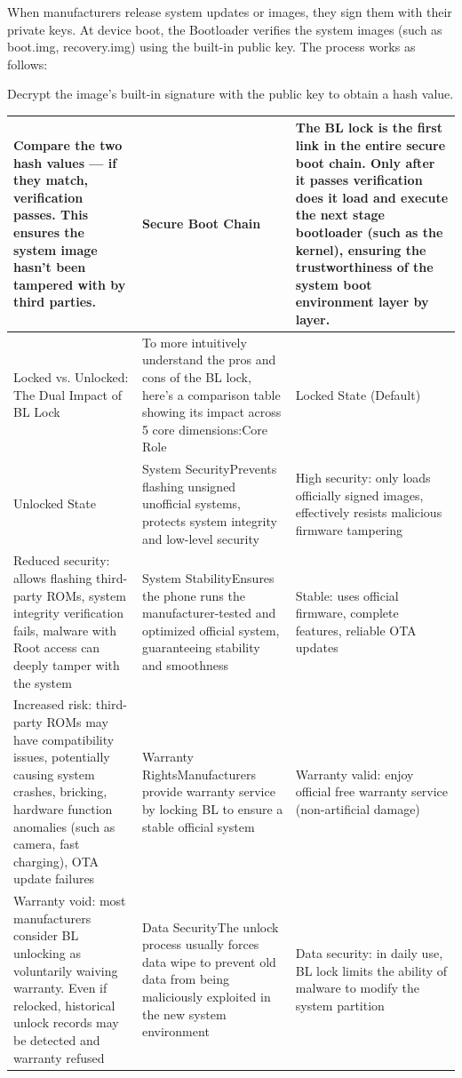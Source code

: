 When manufacturers release system updates or images, they sign them with their private keys. At device boot, the Bootloader verifies the system images (such as boot.img, recovery.img) using the built-in public key. The process works as follows:


Decrypt the image's built-in signature with the public key to obtain a hash value.

\begin{center}
\begin{tabularx}{\linewidth}{|X|X|X|}
\hline
\textbf{Compare the two hash values — if they match, verification passes. This ensures the system image hasn't been tampered with by third parties.} & \textbf{Secure Boot Chain} & \textbf{The BL lock is the first link in the entire secure boot chain. Only after it passes verification does it load and execute the next stage bootloader (such as the kernel), ensuring the trustworthiness of the system boot environment layer by layer.} \tabularnewline
\hline
Locked vs. Unlocked: The Dual Impact of BL Lock & To more intuitively understand the pros and cons of the BL lock, here's a comparison table showing its impact across 5 core dimensions:\newline Core Role & Locked State (Default) \tabularnewline
Unlocked State & System Security\newline Prevents flashing unsigned unofficial systems, protects system integrity and low-level security & High security: only loads officially signed images, effectively resists malicious firmware tampering \tabularnewline
Reduced security: allows flashing third-party ROMs, system integrity verification fails, malware with Root access can deeply tamper with the system & System Stability\newline Ensures the phone runs the manufacturer-tested and optimized official system, guaranteeing stability and smoothness & Stable: uses official firmware, complete features, reliable OTA updates \tabularnewline
Increased risk: third-party ROMs may have compatibility issues, potentially causing system crashes, bricking, hardware function anomalies (such as camera, fast charging), OTA update failures & Warranty Rights\newline Manufacturers provide warranty service by locking BL to ensure a stable official system & Warranty valid: enjoy official free warranty service (non-artificial damage) \tabularnewline
Warranty void: most manufacturers consider BL unlocking as voluntarily waiving warranty. Even if relocked, historical unlock records may be detected and warranty refused & Data Security\newline The unlock process usually forces data wipe to prevent old data from being maliciously exploited in the new system environment & Data security: in daily use, BL lock limits the ability of malware to modify the system partition \tabularnewline
\hline
\end{tabularx}
\end{center}


